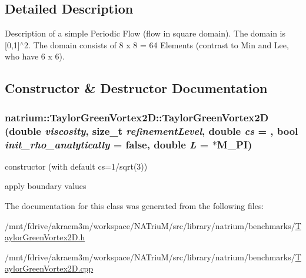 \subsection{Detailed Description}
Description of a simple Periodic Flow (flow in square domain). The domain is \mbox{[}0,1\mbox{]}$^\wedge$2. The domain consists of 8 x 8 = 64 Elements (contrast to Min and Lee, who have 6 x 6). 

\subsection{Constructor \& Destructor Documentation}
\hypertarget{classnatrium_1_1TaylorGreenVortex2D_a7f03f55df315b2b2ac1671fa3d07e9df}{
\subsubsection[{TaylorGreenVortex2D}]{\setlength{\rightskip}{0pt plus 5cm}natrium::TaylorGreenVortex2D::TaylorGreenVortex2D (double {\em viscosity}, \/  size\_\-t {\em refinementLevel}, \/  double {\em cs} = {}, \/  bool {\em init\_\-rho\_\-analytically} = {\ttfamily false}, \/  double {\em L} = {$\ast$M\_\-PI})}}
\label{classnatrium_1_1TaylorGreenVortex2D_a7f03f55df315b2b2ac1671fa3d07e9df}


constructor (with default cs=1/sqrt(3)) 

apply boundary values 

The documentation for this class was generated from the following files:\begin{DoxyCompactItemize}
\item 
/mnt/fdrive/akraem3m/workspace/NATriuM/src/library/natrium/benchmarks/\hyperlink{TaylorGreenVortex2D_8h}{TaylorGreenVortex2D.h}\item 
/mnt/fdrive/akraem3m/workspace/NATriuM/src/library/natrium/benchmarks/\hyperlink{TaylorGreenVortex2D_8cpp}{TaylorGreenVortex2D.cpp}\end{DoxyCompactItemize}
